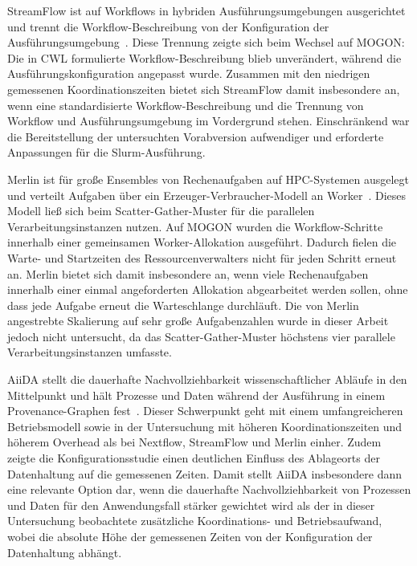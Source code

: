 StreamFlow ist auf Workflows in hybriden Ausführungsumgebungen
ausgerichtet und trennt die Workflow-Beschreibung von der
Konfiguration der
Ausführungsumgebung~\cite{colonnelli2021streamflow}. Diese Trennung
zeigte sich beim Wechsel auf MOGON: Die in CWL formulierte
Workflow-Beschreibung blieb unverändert, während die
Ausführungskonfiguration angepasst wurde. Zusammen mit den
niedrigen gemessenen Koordinationszeiten bietet sich StreamFlow
damit insbesondere an, wenn eine standardisierte
Workflow-Beschreibung und die Trennung von Workflow und
Ausführungsumgebung im Vordergrund stehen. Einschränkend war die
Bereitstellung der untersuchten Vorabversion aufwendiger und
erforderte Anpassungen für die Slurm-Ausführung.

Merlin ist für große Ensembles von Rechenaufgaben auf HPC-Systemen
ausgelegt und verteilt Aufgaben über ein
Erzeuger-Verbraucher-Modell an
Worker~\cite{peterson2022merlin}. Dieses Modell ließ sich beim
Scatter-Gather-Muster für die parallelen Verarbeitungsinstanzen
nutzen. Auf MOGON wurden die Workflow-Schritte innerhalb einer
gemeinsamen Worker-Allokation ausgeführt. Dadurch fielen die
Warte- und Startzeiten des Ressourcenverwalters nicht für jeden
Schritt erneut an. Merlin bietet sich damit insbesondere an, wenn viele Rechenaufgaben innerhalb einer einmal angeforderten Allokation abgearbeitet werden
sollen, ohne dass jede Aufgabe erneut die Warteschlange durchläuft. Die von Merlin
angestrebte Skalierung auf sehr große Aufgabenzahlen wurde in
dieser Arbeit jedoch nicht untersucht, da das
Scatter-Gather-Muster höchstens vier parallele
Verarbeitungsinstanzen umfasste.

AiiDA stellt die dauerhafte Nachvollziehbarkeit wissenschaftlicher
Abläufe in den Mittelpunkt und hält Prozesse und Daten während der
Ausführung in einem Provenance-Graphen
fest~\cite{huber2020aiida}. Dieser Schwerpunkt geht mit einem
umfangreicheren Betriebsmodell sowie in der Untersuchung mit
höheren Koordinationszeiten und höherem Overhead als bei Nextflow,
StreamFlow und Merlin einher. Zudem zeigte die Konfigurationsstudie
einen deutlichen Einfluss des Ablageorts der Datenhaltung auf die
gemessenen Zeiten. Damit stellt AiiDA insbesondere dann eine relevante Option dar, wenn die dauerhafte Nachvollziehbarkeit von Prozessen und Daten
für den Anwendungsfall stärker gewichtet wird als der in dieser
Untersuchung beobachtete zusätzliche Koordinations- und
Betriebsaufwand, wobei die absolute Höhe der
gemessenen Zeiten von der Konfiguration der Datenhaltung abhängt.

